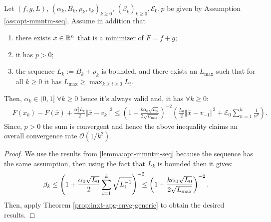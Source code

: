\documentclass[12pt]{article}
\begin{document}
        \begin{proposition}\;\label{prop:opt-cnvg-outr-loop}\\
            Let $(f, g, L)$, $(\alpha_k, B_k, \rho_k, \epsilon_k)_{k \ge 0}$, $(\beta_k)_{k\ge 0}, \mathcal E_0, p$ be given by Assumption \ref{ass:opt-mmntm-seq}. 
            Assume in addition that
            \begin{enumerate}[nosep]
                \item there exists $\bar x \in \mathbb R^n$ that is a minimizer of $F = f + g$;
                \item it has $p > 0$;
                \item the sequence $L_k := B_k + \rho_k$ is bounded, and there exists an $L_{\max}$ such that for all $k \ge 0$ it has $L_{\max} \ge \max_{k\ge i\ge 0} L_i$. 
            \end{enumerate}
            Then, $\alpha_k \in (0, 1]\;\forall k \ge 0$ hence it's always valid and, it has $\forall k \ge 0$: 
            \begin{align*}
                & F(x_k) - F(\bar x) + \frac{\alpha_k^2L_k}{2}\Vert \bar x - v_k\Vert^2
                \le 
                \left(
                    1 + \frac{k\alpha_0\sqrt{L_0}}{2\sqrt{L_{\max}}}
                \right)^{-2}\left(
                    \frac{L_0}{2}\Vert \bar x - v_{-1}\Vert^2
                    + \mathcal E_0 \sum_{n = 1}^{k} \frac{1}{n^p}
                \right). 
            \end{align*}
            Since, $p > 0$ the sum is convergent and hence the above inequality claims an overall convergence rate $\mathcal O(1/k^2)$. 
        \end{proposition}
        \begin{proof}
            We use the results from \ref{lemma:opt-mmntm-seq} because the sequence has the same assumption, then using the fact that $L_k$ is bounded then it gives:
            \begin{align*}
                \beta_k &\le 
                \left(
                    1 + \frac{\alpha_0\sqrt{L_0}}{2}\sum_{i = 1}^{k} \sqrt{L_i^{-1}}
                \right)^{-2}
                \hspace{-0.7em}\le 
                \left(
                    1 + \frac{k\alpha_0\sqrt{L_0}}{2\sqrt{L_{\max}}}
                \right)^{-2}. 
            \end{align*}
            Then, apply Theorem \ref{prop:inxt-apg-cnvg-generic} to obtain the desired results.
        \end{proof}
\end{document}
